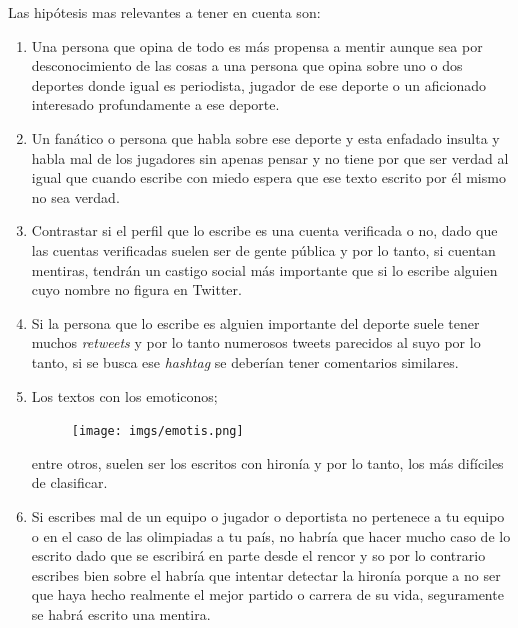 \documentclass[../all.tex]{subfiles}
\begin{document}
		Las hipótesis mas relevantes a tener en cuenta son:
		\begin{enumerate}
			\item Una persona que opina de todo es más propensa a mentir aunque sea por desconocimiento de las cosas a una persona que opina sobre uno o dos deportes donde igual es periodista, jugador de ese deporte o un aficionado interesado profundamente a ese deporte.
			\item Un fanático o persona que habla sobre ese deporte y esta enfadado insulta y habla mal de los jugadores sin apenas pensar y no tiene por que ser verdad al igual que cuando escribe con miedo espera que ese texto escrito por él mismo no sea verdad.
			\item  Contrastar si el perfil que lo escribe es una cuenta verificada o no, dado que las cuentas verificadas suelen ser de gente pública y por lo tanto, si cuentan mentiras, tendrán un castigo social más importante que si lo escribe alguien cuyo nombre no figura en Twitter. 
			\item Si la persona que lo escribe es alguien importante del deporte suele tener muchos \textit{retweets} y por lo tanto numerosos tweets parecidos al suyo por lo tanto, si se busca ese \textit{hashtag} se deberían tener comentarios similares.
			\newpage
			\item Los textos con los emoticonos;
			\begin{figure}[H]
				\centering
				\texttt{[image: imgs/emotis.png]}
			\end{figure}
			entre otros, suelen ser los escritos con hironía y por lo tanto, los más difíciles de clasificar.
			\item Si escribes mal de un equipo o jugador o deportista no pertenece a tu equipo o en el caso de las olimpiadas a tu país, no habría que hacer mucho caso de lo escrito dado que se escribirá en parte desde el rencor y so por lo contrario escribes bien sobre el habría que intentar detectar la hironía porque a no ser que haya hecho realmente el mejor partido o carrera de su vida, seguramente se habrá escrito una mentira.
		\end{enumerate}
		 
\end{document}
